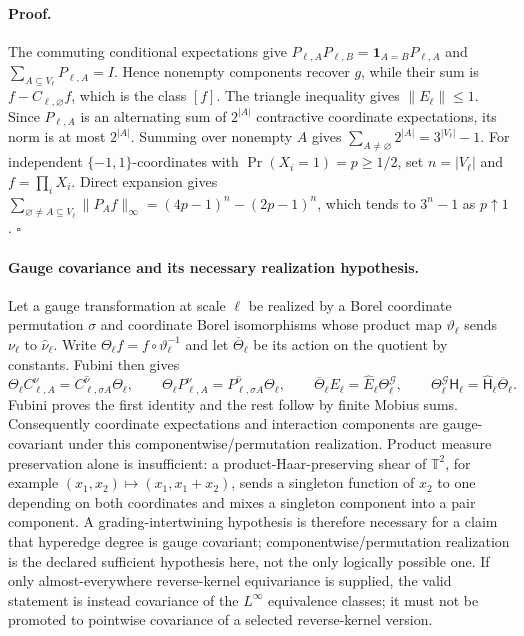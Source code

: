 \paragraph{Proof.}
The commuting conditional expectations give
\(P_{\ell,A}P_{\ell,B}=\mathbf1_{A=B}P_{\ell,A}\) and
\(\sum_{A\subseteq V_\ell}P_{\ell,A}=I\).  Hence nonempty components
recover \(g\), while their sum is \(f-C_{\ell,\varnothing}f\), which is
the class \([f]\).  The triangle inequality gives \(\lVert E_\ell\rVert
\leq1\).  Since \(P_{\ell,A}\) is an alternating sum of \(2^{|A|}\)
contractive coordinate expectations, its norm is at most \(2^{|A|}\).
Summing over nonempty \(A\) gives
\(\sum_{A\ne\varnothing}2^{|A|}=3^{|V_\ell|}-1\).  For independent
\(\{-1,1\}\)-coordinates with \(\Pr(X_i=1)=p\geq1/2\), set
\(n=|V_\ell|\) and \(f=\prod_iX_i\).  Direct expansion gives
\(\sum_{\varnothing\ne A\subseteq V_\ell}\lVert P_Af\rVert_\infty
=(4p-1)^n-(2p-1)^n\), which tends to \(3^n-1\) as \(p\uparrow1\).
\(\square\)

\paragraph{Gauge covariance and its necessary realization hypothesis.}
Let a gauge transformation at scale \(\ell\) be realized by a Borel
coordinate permutation \(\sigma\) and coordinate Borel isomorphisms whose
product map \(\vartheta_\ell\) sends \(\nu_\ell\) to
\(\widehat\nu_\ell\).  Write
\(\Theta_\ell f=f\circ\vartheta_\ell^{-1}\) and let
\(\overline\Theta_\ell\) be its action on the quotient by constants.
Fubini then gives
\begin{equation}
 \Theta_\ell C_{\ell,A}^{\nu}
 =C_{\ell,\sigma A}^{\widehat\nu}\Theta_\ell,\qquad
 \Theta_\ell P_{\ell,A}^{\nu}
 =P_{\ell,\sigma A}^{\widehat\nu}\Theta_\ell,\qquad
 \overline\Theta_\ell E_\ell
 =\widehat E_\ell\Theta_\ell^{\mathcal G},
 \qquad
 \Theta_\ell^{\mathcal G}\mathsf H_\ell
 =\widehat{\mathsf H}_\ell\overline\Theta_\ell.
 \label{eq:rg-hoeffding-gauge-covariance}
\end{equation}
Fubini proves the first identity and the rest follow by finite Mobius sums.
Consequently coordinate expectations and interaction components are
gauge-covariant under this componentwise/permutation realization.  Product
measure preservation alone is insufficient: a product-Haar-preserving shear
of \(\mathbb T^2\), for example \((x_1,x_2)\mapsto
(x_1,x_1+x_2)\), sends a singleton function of \(x_2\) to one depending on
both coordinates and mixes a singleton component into a pair component.  A
grading-intertwining hypothesis is therefore necessary for a claim that
hyperedge degree is gauge covariant; componentwise/permutation realization is
the declared sufficient hypothesis here, not the only logically possible one.
If only almost-everywhere reverse-kernel equivariance is supplied, the valid
statement is instead covariance of the \(L^\infty\) equivalence classes;
it must not be promoted to pointwise covariance of a selected reverse-kernel
version. 

